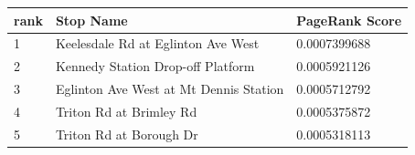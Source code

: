 \begin{tabular}{l l l}
\toprule
rank & Stop Name & PageRank Score \\
\midrule
1 & Keelesdale Rd at Eglinton Ave West & 0.0007399688 \\
2 & Kennedy Station Drop-off Platform & 0.0005921126 \\
3 & Eglinton Ave West at Mt Dennis Station & 0.0005712792 \\
4 & Triton Rd at Brimley Rd & 0.0005375872 \\
5 & Triton Rd at Borough Dr & 0.0005318113 \\
\bottomrule
\end{tabular}

